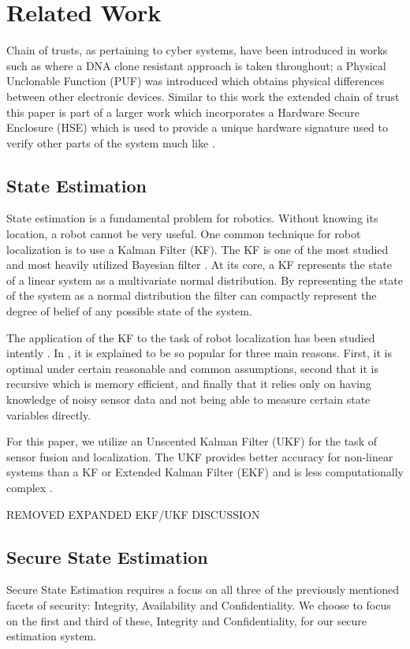 \documentclass[conference]{IEEEtran}
\begin{document}
\section{Related Work}
Chain of trusts, as pertaining to cyber systems, have been introduced in works such as \cite{adi2009mechatronic} where a DNA clone resistant approach is taken throughout; a Physical Unclonable Function (PUF) was introduced which obtains physical differences between other electronic devices. Similar to this work the extended chain of trust this paper is part of a larger work which incorporates a Hardware Secure Enclosure (HSE) which is used to provide a unique hardware signature used to verify other parts of the system much like \cite{adi2009mechatronic}.

\subsection{State Estimation}
State estimation is a fundamental problem for robotics. Without knowing its location, a robot cannot be very useful. One common technique for robot localization is to use a Kalman Filter (KF). The KF is one of the most studied and most heavily utilized Bayesian filter \cite[39-81]{ProbabilisticRobotics}. At its core, a KF represents the state of a linear system as a multivariate normal distribution. By representing the state of the system as a normal distribution the filter can compactly represent the degree of belief of any possible state of the system.

The application of the KF to the task of robot localization has been studied intently \cite{Localization2003, Mohsin2014}. In \cite{Mohsin2014}, it is explained to be so popular for three main reasons. First, it is optimal under certain reasonable and common assumptions, second that it is recursive which is memory efficient, and finally that it relies only on having knowledge of noisy sensor data and not being able to measure certain state variables directly.

For this paper, we utilize an Unscented Kalman Filter (UKF) for the task of sensor fusion and localization. The UKF provides better accuracy for non-linear systems than a KF or Extended Kalman Filter (EKF) and is less computationally complex \cite{Julier1997}.

REMOVED EXPANDED EKF/UKF DISCUSSION

\subsection{Secure State Estimation}
Secure State Estimation requires a focus on all three of the previously mentioned facets of security: Integrity, Availability and Confidentiality. We choose to focus on the first and third of these, Integrity and Confidentiality, for our secure estimation system.
\end{document}
